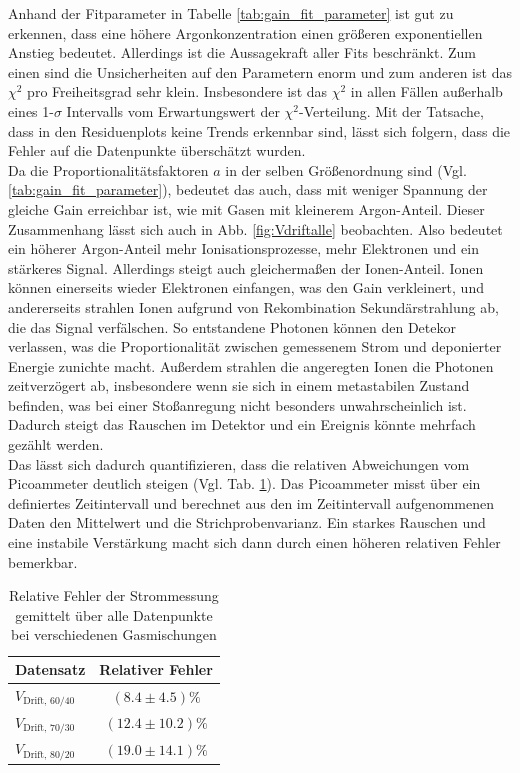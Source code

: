 Anhand der Fitparameter in Tabelle \ref{tab:gain_fit_parameter} ist gut zu erkennen, dass eine höhere Argonkonzentration einen größeren exponentiellen Anstieg bedeutet. Allerdings ist die Aussagekraft aller Fits beschränkt. Zum einen sind die Unsicherheiten auf den Parametern enorm und zum anderen ist das $\chi^2$ pro Freiheitsgrad sehr klein. Insbesondere ist das $\chi^2$ in allen Fällen außerhalb eines 1-$\sigma$ Intervalls vom Erwartungswert der $\chi^2$-Verteilung. Mit der Tatsache, dass in den Residuenplots keine Trends erkennbar sind, lässt sich folgern, dass die Fehler auf die Datenpunkte überschätzt wurden.\\ Da die Proportionalitätsfaktoren $a$ in der selben Größenordnung sind (Vgl. \ref{tab:gain_fit_parameter}), bedeutet das auch, dass mit weniger Spannung der gleiche Gain erreichbar ist, wie mit Gasen mit kleinerem Argon-Anteil. Dieser Zusammenhang lässt sich auch in Abb. \ref{fig:Vdriftalle} beobachten.
Also bedeutet ein höherer Argon-Anteil mehr Ionisationsprozesse, mehr Elektronen und ein stärkeres Signal. Allerdings steigt auch gleichermaßen der Ionen-Anteil. Ionen können einerseits wieder Elektronen einfangen, was den Gain verkleinert, und andererseits strahlen Ionen aufgrund von Rekombination Sekundärstrahlung ab, die das Signal verfälschen. So entstandene Photonen können den Detekor verlassen, was die Proportionalität zwischen gemessenem Strom und deponierter Energie zunichte macht. Außerdem strahlen die angeregten Ionen die Photonen zeitverzögert ab, insbesondere wenn sie sich in einem metastabilen Zustand befinden, was bei einer Stoßanregung nicht besonders unwahrscheinlich ist. Dadurch steigt das Rauschen im Detektor und ein Ereignis könnte mehrfach gezählt werden.\\
Das lässt sich dadurch quantifizieren, dass die relativen Abweichungen vom Picoammeter deutlich steigen (Vgl. Tab. \ref{tab:rel_fehler_strom}). Das Picoammeter misst über ein definiertes Zeitintervall und berechnet aus den im Zeitintervall aufgenommenen Daten den Mittelwert und die Strichprobenvarianz. Ein starkes Rauschen und eine instabile Verstärkung macht sich dann durch einen höheren relativen Fehler bemerkbar. 

\begin{table}[h]
    \centering
    \begin{tabular}{|l||c|}
        \hline
        Datensatz & {Relativer Fehler} \\
        \hline
        $V_{\text{Drift, 60/40}}$ & $(8.4 \pm 4.5)\%$ \\
        $V_{\text{Drift, 70/30}}$ & $(12.4 \pm 10.2)\%$ \\
        $V_{\text{Drift, 80/20}}$ & $(19.0 \pm 14.1)\%$ \\
        \hline
    \end{tabular}
    \caption{Relative Fehler der Strommessung gemittelt über alle Datenpunkte bei verschiedenen Gasmischungen}
    \label{tab:rel_fehler_strom}
\end{table}

